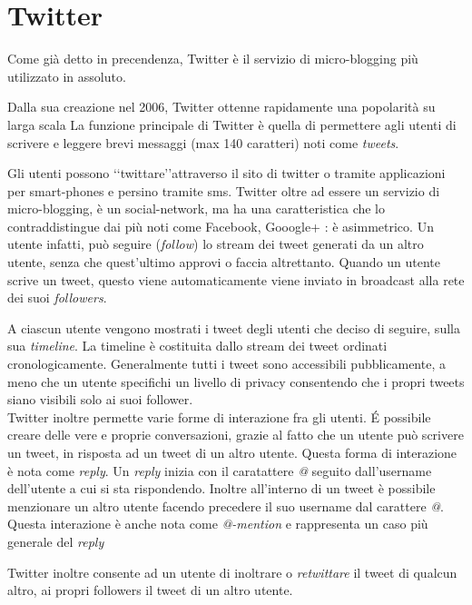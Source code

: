 \section{Twitter}
 

Come già detto in precendenza, Twitter è il servizio di micro-blogging più utilizzato in assoluto.

Dalla sua creazione nel 2006, Twitter ottenne rapidamente una popolarità su larga scala 
La funzione principale di Twitter è quella di permettere agli utenti di scrivere e leggere brevi messaggi (max 140 caratteri) noti come \emph{tweets}.

Gli utenti possono \lq\lq twittare\rq\rq attraverso il sito di twitter o tramite applicazioni per smart-phones e persino tramite sms. 
Twitter oltre ad essere un servizio di micro-blogging, è un social-network, ma ha una caratteristica che lo contraddistingue dai più noti come Facebook, Gooogle+ : è 
asimmetrico. Un utente infatti, può seguire (\emph{follow}) lo stream dei tweet generati da un altro utente, senza che quest'ultimo approvi o faccia altrettanto. 
Quando un utente scrive un tweet, questo viene automaticamente viene inviato in broadcast alla rete dei suoi \emph{followers}.

A ciascun utente vengono mostrati i tweet degli utenti che deciso di seguire, sulla sua \emph{timeline}.
La timeline è costituita dallo stream dei tweet ordinati cronologicamente.
Generalmente tutti i tweet sono accessibili pubblicamente, a meno che un utente specifichi un livello di privacy  consentendo che i propri tweets siano visibili solo ai suoi follower.\\

Twitter inoltre permette  varie forme di interazione fra gli utenti.
\'E possibile creare delle vere e proprie conversazioni, grazie al fatto che un utente può scrivere un tweet, in risposta ad un tweet di un altro utente. 	Questa forma di interazione è nota come \emph{reply}.
Un \emph{reply} inizia con il caratattere \emph{@} seguito dall'username dell'utente a cui si sta rispondendo.
Inoltre all'interno di un tweet è possibile menzionare un altro utente facendo precedere il suo username dal carattere  \emph{@}. Questa interazione è anche nota come \emph{@-mention} e rappresenta un caso più generale del \emph{reply} 

Twitter inoltre consente ad un utente di inoltrare o \emph{retwittare} il tweet di qualcun altro, ai propri followers il tweet di un altro utente.


